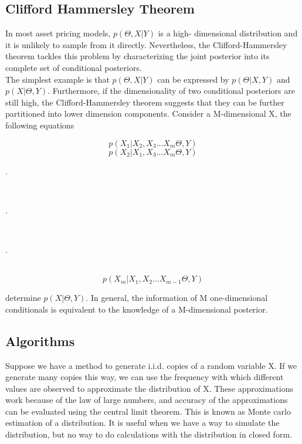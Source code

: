 \documentclass[letterpaper]{article}
\begin{document}
	\subsection{Clifford Hammersley Theorem}
	In most asset pricing models, $p(\Theta,X|Y)$ is a high- dimensional distribution and it is unlikely to sample from it directly. Nevertheless, the Clifford-Hammersley theorem tackles this problem by characterizing the joint posterior into its complete set of conditional posteriors. \\
	
	The simplest example is that $p(\Theta,X|Y)$ can be expressed by $p(\Theta|X,Y)$ and $p(X|\Theta,Y)$. Furthermore, if the dimensionality of two conditional posteriors are still high, the Clifford-Hammersley theorem suggests that they can be further partitioned into lower dimension components. Consider a M-dimensional X, the following equations 
	
	\begin{equation}
	p(X_1|X_2,X_3...X_m\Theta,Y)
	\end{equation}
	\begin{equation}
	p(X_2|X_1,X_3...X_m\Theta,Y)
	\end{equation}
	\centerline{.}\\
	\centerline{.}\\
	\centerline{.}\\
	\begin{equation}
	p(X_m|X_1,X_2...X_{m-1}\Theta,Y)
	\end{equation}
	
	determine $p(X|\Theta,Y)$. In general, the information of M one-dimensional conditionals is equivalent to the knowledge of a M-dimensional posterior.
	
	\subsection{Algorithms}
	Suppose we have a method to generate i.i.d. copies of a random variable X. If we generate many copies this way, we can use the frequency with which different values are observed to approximate the distribution of X. These approximations work because of the law of large numbers, and accuracy of the approximations can be evaluated using the central limit theorem. This is known as Monte carlo estimation of a distribution. It is useful when we have a way to simulate the distribution, but no way to do calculations with the distribution in closed form. \\
	
\end{document}
